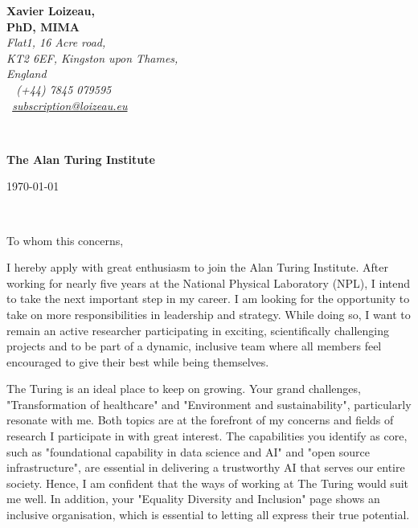 \documentclass[12pt]{article}
\begin{document}
\sffamily   %
\hfill%
\begin{minipage}[t]{.6\textwidth}
\raggedleft%
{\bfseries Xavier Loizeau, \\ PhD, MIMA}\\[.35ex]
\small\itshape%
Flat1, 16 Acre road,\\
KT2 6EF, Kingston upon Thames,\\
England\\[.35ex]
\faMobile~ (+44) 7845 079595\\
\faAt~\href{mailto:subscription@loizeau.eu}{subscription@loizeau.eu}
\end{minipage}\\[1em]
%
\begin{minipage}[t]{.4\textwidth}
\raggedright%
{\bfseries The Alan Turing Institute}\\
\end{minipage}
\hfill %
\begin{minipage}[t]{.4\textwidth}
\raggedleft %
\today
\end{minipage}\\
\raggedright

To whom this concerns,

I hereby apply with great enthusiasm to join the Alan Turing Institute.
After working for nearly five years at the National Physical Laboratory (NPL), I intend to take the next important step in my career.
I am looking for the opportunity to take on more responsibilities in leadership and strategy.
While doing so, I want to remain an active researcher participating in exciting, scientifically challenging projects and to be part of a dynamic, inclusive team where all members feel encouraged to give their best while being themselves.

\medskip

The Turing is an ideal place to keep on growing.
Your grand challenges, "Transformation of healthcare" and "Environment and sustainability", particularly resonate with me.
Both topics are at the forefront of my concerns and fields of research I participate in with great interest.
The capabilities you identify as core, such as "foundational capability in data science and AI" and "open source infrastructure", are essential in delivering a trustworthy AI that serves our entire society.
Hence, I am confident that the ways of working at The Turing would suit me well.
In addition, your "Equality Diversity and Inclusion" page shows an inclusive organisation, which is essential to letting all express their true potential.
\end{document}
